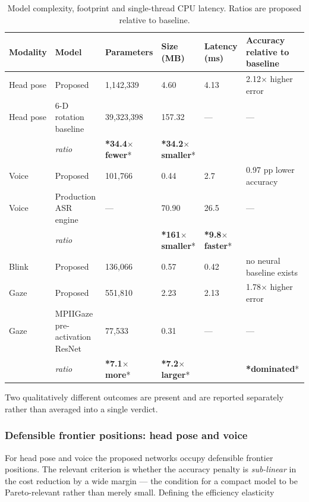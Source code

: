 \begin{table}[pos=htbp]
\centering
\caption{Model complexity, footprint and single-thread CPU latency. Ratios are proposed relative to baseline.}
\label{tab:12}
\footnotesize
\begin{tabularx}{\textwidth}{XXXXXX}
\toprule
\textbf{Modality} & \textbf{Model} & \textbf{Parameters} & \textbf{Size (MB)} & \textbf{Latency (ms)} & \textbf{Accuracy relative to baseline} \\
\midrule
Head pose & Proposed & 1,142,339 & 4.60 & 4.13 & 2.12$\times$ higher error \\
Head pose & 6-D rotation baseline & 39,323,398 & 157.32 & --- & --- \\
 & \emph{ratio} & \textbf{*34.4$\times$ fewer}* & \textbf{*34.2$\times$ smaller}* &  &  \\
Voice & Proposed & 101,766 & 0.44 & 2.7 & 0.97 pp lower accuracy \\
Voice & Production ASR engine & --- & 70.90 & 26.5 & --- \\
 & \emph{ratio} &  & \textbf{*161$\times$ smaller}* & \textbf{*9.8$\times$ faster}* &  \\
Blink & Proposed & 136,066 & 0.57 & 0.42 & no neural baseline exists \\
Gaze & Proposed & 551,810 & 2.23 & 2.13 & 1.78$\times$ higher error \\
Gaze & MPIIGaze pre-activation ResNet & 77,533 & 0.31 & --- & --- \\
 & \emph{ratio} & \textbf{*7.1$\times$ more}* & \textbf{*7.2$\times$ larger}* &  & \textbf{*dominated}* \\
\bottomrule
\end{tabularx}
\end{table}

Two qualitatively different outcomes are present and are reported separately rather than averaged into a single verdict.

\subsubsection{Defensible frontier positions: head pose and voice}

For head pose and voice the proposed networks occupy defensible frontier positions. The relevant criterion is whether the accuracy penalty is \emph{sub-linear} in the cost reduction by a wide margin --- the condition for a compact model to be Pareto-relevant rather than merely small. Defining the efficiency elasticity

